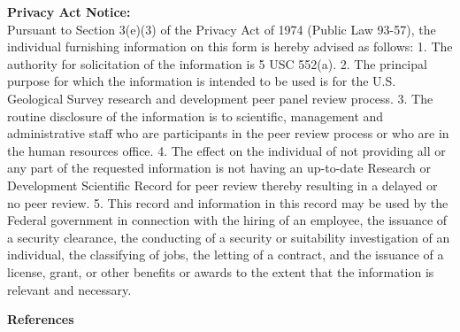 \documentclass[12pt]{article}
\begin{document}
\vspace{10pt}
\textbf{Privacy Act Notice:} \\
\scriptsize Pursuant to Section 3(e)(3) of the Privacy Act of 1974 (Public Law 93-57), the individual furnishing information on this form is hereby advised as follows: 1. The authority for solicitation of the information is 5 USC 552(a). 2. The principal purpose for which the information is intended to be used is for the U.S. Geological Survey research and development peer panel review process. 3. The routine disclosure of the information is to scientific, management and administrative staff who are participants in the peer review process or who are in the human resources office. 4. The effect on the individual of not providing all or any part of the requested information is not having an up-to-date Research or Development Scientific Record for peer review thereby resulting in a delayed or no peer review. 5. This record and information in this record may be used by the Federal government in connection with the hiring of an employee, the issuance of a security clearance, the conducting of a security or suitability investigation of an individual, the classifying of jobs, the letting of a contract, and the issuance of a license, grant, or other benefits or awards to the extent that the information is relevant and necessary.
\normalsize



\newpage
\centering \large \textbf{References}
\normalsize
\end{document}
